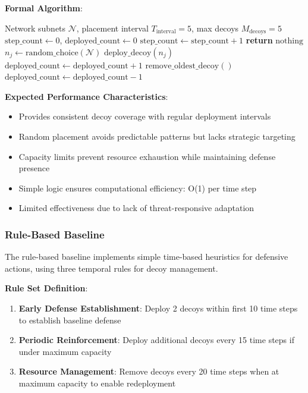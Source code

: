 \documentclass[12pt,oneside]{article}
\begin{document}
\textbf{Formal Algorithm}:
\begin{algorithm}[H]
\caption{Static Decoy Placement Baseline}
\label{alg:static_baseline}
\begin{algorithmic}[1]
\REQUIRE Network subnets $\mathcal{N}$, placement interval $T_{\text{interval}} = 5$, max decoys $M_{\text{decoys}} = 5$
\STATE $\text{step\_count} \leftarrow 0$, $\text{deployed\_count} \leftarrow 0$
    \STATE $\text{step\_count} \leftarrow \text{step\_count} + 1$
        \STATE \textbf{return} $\text{nothing}$ 
    \ENDIF
        \STATE $n_j \leftarrow \text{random\_choice}(\mathcal{N})$ 
        \STATE $\text{deploy\_decoy}(n_j)$
        \STATE $\text{deployed\_count} \leftarrow \text{deployed\_count} + 1$
    \ELSE
        \STATE $\text{remove\_oldest\_decoy}()$ 
        \STATE $\text{deployed\_count} \leftarrow \text{deployed\_count} - 1$
    \ENDIF
\ENDWHILE
\end{algorithmic}
\end{algorithm}

\textbf{Expected Performance Characteristics}:
\begin{itemize}
    \item Provides consistent decoy coverage with regular deployment intervals
    \item Random placement avoids predictable patterns but lacks strategic targeting
    \item Capacity limits prevent resource exhaustion while maintaining defense presence
    \item Simple logic ensures computational efficiency: O(1) per time step
    \item Limited effectiveness due to lack of threat-responsive adaptation
\end{itemize}

\subsubsection{Rule-Based Baseline}

The rule-based baseline implements simple time-based heuristics for defensive actions, using three temporal rules for decoy management.

\textbf{Rule Set Definition}:
\begin{enumerate}
    \item \textbf{Early Defense Establishment}: Deploy 2 decoys within first 10 time steps to establish baseline defense
    \item \textbf{Periodic Reinforcement}: Deploy additional decoys every 15 time steps if under maximum capacity
    \item \textbf{Resource Management}: Remove decoys every 20 time steps when at maximum capacity to enable redeployment
\end{enumerate}
\end{document}
